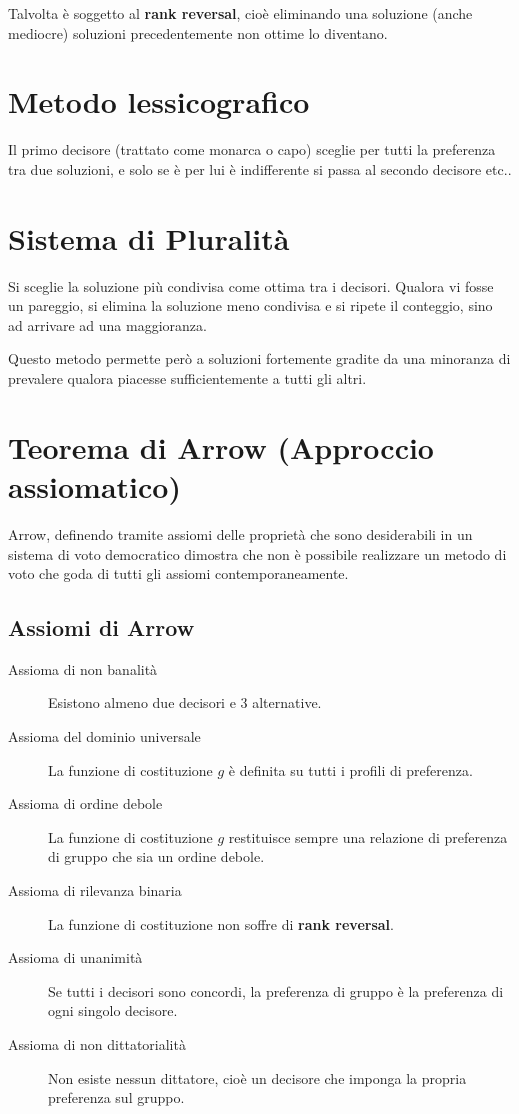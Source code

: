 \documentclass[\main/main.tex]{subfiles}
\begin{document}
Talvolta è soggetto al \textbf{rank reversal}, cioè eliminando una soluzione (anche mediocre) soluzioni precedentemente non ottime lo diventano.

\section{Metodo lessicografico}
Il primo decisore (trattato come monarca o capo) sceglie per tutti la preferenza tra due soluzioni, e solo se è per lui è indifferente si passa al secondo decisore etc..

\section{Sistema di Pluralità}
Si sceglie la soluzione più condivisa come ottima tra i decisori. Qualora vi fosse un pareggio, si elimina la soluzione meno condivisa e si ripete il conteggio, sino ad arrivare ad una maggioranza.

Questo metodo permette però a soluzioni fortemente gradite da una minoranza di prevalere qualora piacesse sufficientemente a tutti gli altri.

\section{Teorema di Arrow (Approccio assiomatico)}
Arrow, definendo tramite assiomi delle proprietà che sono desiderabili in un sistema di voto democratico dimostra che non è possibile realizzare un metodo di voto che goda di tutti gli assiomi contemporaneamente.

\subsection{Assiomi di Arrow}
\begin{description}
  \item[Assioma di non banalità] Esistono almeno due decisori e 3 alternative.
  \item[Assioma del dominio universale] La funzione di costituzione $g$ è definita su tutti i profili di preferenza.
  \item[Assioma di ordine debole] La funzione di costituzione $g$ restituisce sempre una relazione di preferenza di gruppo che sia un ordine debole.
  \item[Assioma di rilevanza binaria] La funzione di costituzione non soffre di \textbf{rank reversal}.
  \item[Assioma di unanimità] Se tutti i decisori sono concordi, la preferenza di gruppo è la preferenza di ogni singolo decisore.
  \item[Assioma di non dittatorialità] Non esiste nessun dittatore, cioè un decisore che imponga la propria preferenza sul gruppo.
\end{description}
\end{document}
